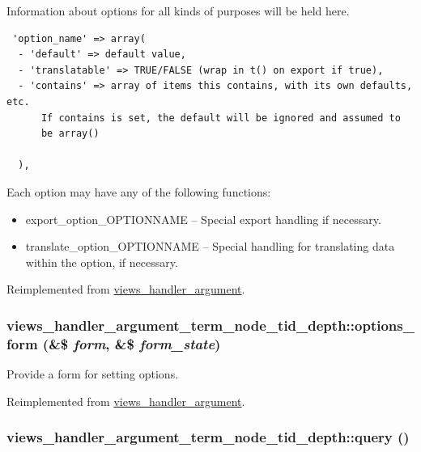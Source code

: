 Information about options for all kinds of purposes will be held here. 

\begin{Code}\begin{verbatim} 'option_name' => array(
  - 'default' => default value,
  - 'translatable' => TRUE/FALSE (wrap in t() on export if true),
  - 'contains' => array of items this contains, with its own defaults, etc.
      If contains is set, the default will be ignored and assumed to
      be array()

  ),
\end{verbatim}
\end{Code}

 Each option may have any of the following functions:\begin{itemize}
\item export\_\-option\_\-OPTIONNAME -- Special export handling if necessary.\item translate\_\-option\_\-OPTIONNAME -- Special handling for translating data within the option, if necessary. \end{itemize}


Reimplemented from \hyperlink{classviews__handler__argument_117ab20a53624e082e6e32a22d4521cc}{views\_\-handler\_\-argument}.\hypertarget{classviews__handler__argument__term__node__tid__depth_db15b091303182e330a162d384676e50}{
\subsubsection[{options\_\-form}]{\setlength{\rightskip}{0pt plus 5cm}views\_\-handler\_\-argument\_\-term\_\-node\_\-tid\_\-depth::options\_\-form (\&\$ {\em form}, \/  \&\$ {\em form\_\-state})}}
\label{classviews__handler__argument__term__node__tid__depth_db15b091303182e330a162d384676e50}


Provide a form for setting options. 

Reimplemented from \hyperlink{classviews__handler__argument_44f015a0d527983ae6df2689f66b2c24}{views\_\-handler\_\-argument}.\hypertarget{classviews__handler__argument__term__node__tid__depth_8956dffc5b8c1b5adef8cdc6e897c7ab}{
\subsubsection[{query}]{\setlength{\rightskip}{0pt plus 5cm}views\_\-handler\_\-argument\_\-term\_\-node\_\-tid\_\-depth::query ()}}
\label{classviews__handler__argument__term__node__tid__depth_8956dffc5b8c1b5adef8cdc6e897c7ab}


